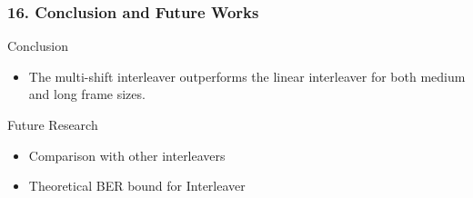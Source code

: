 \documentclass{beamer}  %
\begin{document}
\begin{frame}
\frametitle{16. Conclusion and Future Works}
\begin{block}{Conclusion}
\begin{itemize}
\setlength\itemsep{2em}
\item The multi-shift
interleaver outperforms the linear interleaver for both medium and long frame sizes. 
\end{itemize}
\end{block}

\begin{block}{Future Research }



\begin{itemize}


\item Comparison with other interleavers

\item Theoretical BER bound for Interleaver







\end{itemize}
\end{block}
\end{frame}
\end{document}
